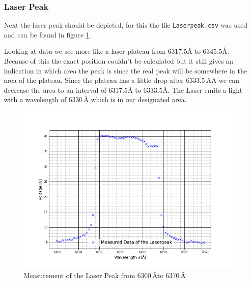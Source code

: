 \subsubsection{Laser Peak}
Next the laser peak should be depicted, for this the file \verb|Laserpeak.csv| was used and can be found in figure \ref{figLaser}.\par
Looking at data we see more like a laser plateau from $6317.5\text{\AA}$ to $6345.5\text{\AA}$. Because  of this the exact position couldn't be calculated but it still gives an indication in which area the peak is since the real peak will be somewhere in the area of the plateau. Since the plateau has a little drop after $6333.5\,\text{AA}$ we can decrease the area to an interval of $6317.5\text{\AA}$ to $6333.5\text{\AA}$. The Laser emits a light with a wavelength of $6330\,\text{\AA}$ which is in our designated area. 
\begin{figure}[ht]
	\includegraphics[scale=0.5]{Bild/Lpeak.png}
	\centering
	\caption[Laser Peak]{Measurement of the Laser Peak from $6300\,$\AA to $6370$\,\AA}
	\label{figLaser}
\end{figure}
\newpage
